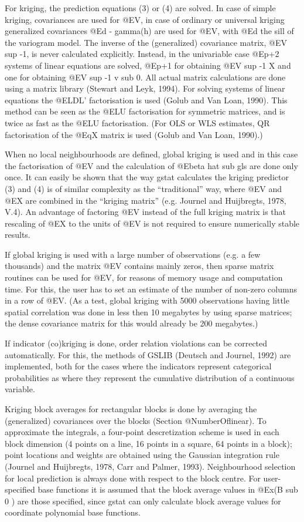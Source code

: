 \documentclass{article}
\begin{document}
For kriging, the prediction equations (3) or (4) are solved. In case
of simple kriging, covariances are used for @E{V}, in case of ordinary
or universal kriging generalized covariances @E{d - gamma(h)} are used
for @E{V}, with @E{d} the sill of the variogram model. The inverse of
the (generalized) covariance matrix, @E{V sup -1}, is never calculated
explicitly. Instead, in the univariable case @E{p+2} systems of linear
equations are solved, @E{p+1} for obtaining @E{V sup -1 X} and one for
obtaining @E{V sup -1 v sub 0}. All actual matrix calculations are done
using a matrix library (Stewart and Leyk, 1994). For solving systems of
linear equations the @E{LDL'} factorisation is used (Golub and Van Loan,
1990). This method can be seen as the @E{LU} factorisation for symmetric
matrices, and is twice as fast as the @E{LU} factorisation. (For OLS or
WLS estimates, QR factorisation of the @Eq{X} matrix is used (Golub and
Van Loan, 1990).)

When no local neighbourhoods are defined, global kriging is used and in
this case the factorisation of @E{V} and the calculation of @E{beta hat
sub gls} are done only once. It can easily be shown that the way gstat
calculates the kriging predictor (3) and (4) is of similar complexity as
the ``traditional'' way, where @E{V} and @E{X} are combined in the
``kriging matrix'' (e.g. Journel and Huijbregts, 1978, V.4). An
advantage of factoring @E{V} instead of the full kriging matrix is that
rescaling of @E{X} to the units of @E{V} is not required to ensure
numerically stable results.

If global kriging is used with a large number of observations (e.g. a
few thousands) and the matrix @E{V} contains mainly zeros, then sparse
matrix routines can be used for @E{V}, for reasons of memory usage and
computation time. For this, the user has to set an estimate of the number
of non-zero columns in a row of @E{V}. (As a test, global kriging with
5000 observations having little spatial correlation was done in less
then 10 megabytes by using sparse matrices; the dense covariance matrix
for this would already be 200 megabytes.)

If indicator (co)kriging is done, order relation violations can be
corrected automatically. For this, the methods of GSLIB (Deutsch and
Journel, 1992) are implemented, both for the cases where the indicators
represent categorical probabilities as where they represent the
cumulative distribution of a continuous variable.

Kriging block averages for rectangular blocks is done by averaging the
(generalized) covariances over the blocks (Section @NumberOf{linear}).
To approximate the integrals, a four-point descretization scheme is used
in each block dimension (4 points on a line, 16 points in a square, 64
points in a block); point locations and weights are obtained using the
Gaussian integration rule (Journel and Huijbregts, 1978, Carr and
Palmer, 1993). Neighbourhood selection for local prediction is always
done with respect to the block centre.  For user-specified base
functions it is assumed that the block average values in @E{x(B sub 0 )}
are those specified, since gstat can only calculate block average values
for coordinate polynomial base functions.
\end{document}
